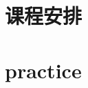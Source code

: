 \documentclass[
]{book}
\begin{document}
\hypertarget{ux8bfeux7a0bux5b89ux6392}{%
\section*{\texorpdfstring{\textbf{课程安排}}{课程安排}}\label{ux8bfeux7a0bux5b89ux6392}}

\hypertarget{practice}{%
\section*{\texorpdfstring{\textbf{practice}}{practice}}\label{practice}}

  
\end{document}
